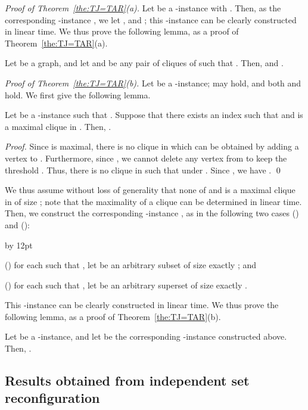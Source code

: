 \documentclass{llncs}
\newenvironment{listing}[1]{\begin{list}{*}{\settowidth{\labelwidth}{#1}\setlength{\leftmargin}{\labelwidth}\advance \leftmargin by 12pt
\setlength{\itemsep}{0pt}\setlength{\parsep}{0pt}\setlength{\topsep}{0pt}\setlength{\parskip}{0pt}}}{\end{list}}
\newcounter{one}
\newcommand{\one}{{\rm \roman{one}}}
\newcounter{two}
\newcommand{\two}{{\rm \roman{two}}}
\begin{document}
	\noindent
	{\em Proof of Theorem~{\rm \ref{the:TJ=TAR}(}a{\rm )}.}
	Let  be a -instance with .
	Then, as the corresponding -instance , we let ,  and ;
this -instance can be clearly constructed in linear time.
	We thus prove the following lemma, as a proof of Theorem~\ref{the:TJ=TAR}(a).
	\begin{lemma} \label{lem:TJ->TAR}
	Let  be a graph, and let  and  be any pair of cliques of  such that .
	Then,  and .
	\end{lemma}

	\noindent
	{\em Proof of Theorem~{\rm \ref{the:TJ=TAR}(}b{\rm )}.}
	Let  be a -instance; 
 may hold, and both  and  hold.
	We first give the following lemma.
	\begin{lemma}
	Let  be a -instance such that .
	Suppose that there exists an index  such that  and  is a maximal clique in .
	Then, . 
	\end{lemma}
	\begin{proof}
	Since  is maximal, there is no clique in  which can be obtained by adding a vertex to . 
	Furthermore, since , we cannot delete any vertex from  to keep the threshold . 
	Thus, there is no clique  in  such that  under .
	Since , we have . 
	\qed
	\end{proof}

	We thus assume without loss of generality that none of  and  is a maximal clique in  of size ;
note that the maximality of a clique can be determined in linear time. 
	Then, we construct the corresponding -instance , as in the following two cases (\one) and (\two):
	\begin{listing}{aaa}
	\item[(\one)] for each  such that , let  be an arbitrary subset of size exactly ; and
	\item[(\two)] for each  such that , let  be an arbitrary superset of size exactly .
	\end{listing}
	This -instance can be clearly constructed in linear time.
	We thus prove the following lemma, as a proof of Theorem~\ref{the:TJ=TAR}(b).
	\begin{lemma} \label{lem:TJ=TARb}
	Let  be a -instance, and let  be the corresponding -instance constructed above.
	Then, .
	\end{lemma}

\subsection{Results obtained from {\sc independent set reconfiguration}}
\label{subsec:independent-clique}
\end{document}
